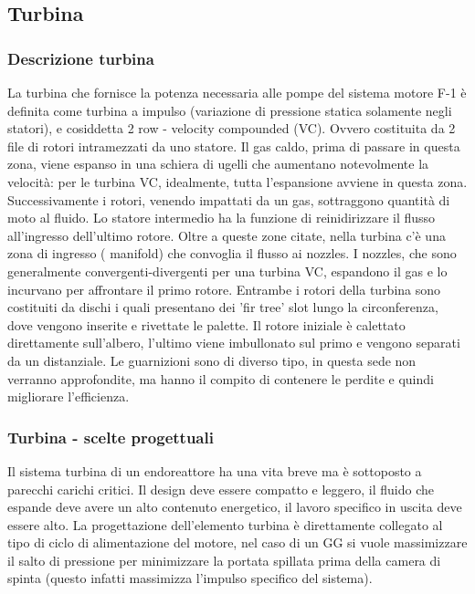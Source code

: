 \subsection{Turbina}
\label{subsec:turbina}

\subsubsection{Descrizione turbina}


La turbina che fornisce la potenza necessaria alle pompe del sistema motore F-1 è definita come turbina a impulso (variazione di pressione statica solamente negli statori), e cosiddetta 2 row - velocity compounded (VC). Ovvero costituita da 2 file di rotori intramezzati da uno statore. Il gas caldo, prima di passare in questa zona, viene espanso in una schiera di ugelli che aumentano notevolmente la velocità: per le turbina VC, idealmente, tutta l'espansione avviene in questa zona. Successivamente i rotori, venendo impattati da un gas, sottraggono quantità di moto al fluido. Lo statore intermedio ha la funzione di reinidirizzare il flusso all'ingresso dell'ultimo rotore. Oltre a queste zone citate, nella turbina c'è una zona di ingresso ( manifold) che convoglia il flusso ai nozzles. I nozzles, che sono generalmente convergenti-divergenti per una turbina VC, espandono il gas e lo incurvano per affrontare il primo rotore. Entrambe i rotori della turbina sono costituiti da dischi i quali presentano dei 'fir tree' slot lungo la circonferenza, dove vengono inserite e rivettate le palette. Il rotore iniziale è calettato direttamente sull'albero, l'ultimo viene imbullonato sul primo e vengono separati da un distanziale. Le guarnizioni sono di diverso tipo, in questa sede non verranno approfondite, ma hanno il compito di contenere le perdite e quindi migliorare l'efficienza. \cite{AIAA_book_2} \cite{turbine_design}

\subsubsection{Turbina - scelte progettuali}

Il sistema turbina di un endoreattore ha una vita breve ma è sottoposto a parecchi carichi critici. Il design deve essere compatto e leggero, il fluido che espande deve avere un alto contenuto energetico, il lavoro specifico in uscita deve essere alto. La progettazione dell'elemento turbina è direttamente collegato al tipo di ciclo di alimentazione del motore, nel caso di un GG si vuole massimizzare il salto di pressione per minimizzare la portata spillata prima della camera di spinta (questo infatti massimizza l'impulso specifico del sistema). 

